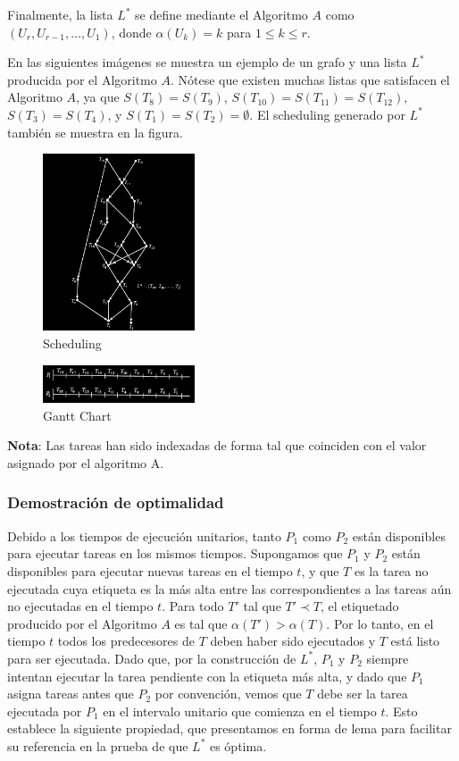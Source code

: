 \documentclass[14pt]{extarticle}
\begin{document}
Finalmente, la lista $L^*$ se define mediante el Algoritmo $A$ como $(U_r, U_{r-1}, \ldots, U_1)$, donde $\alpha(U_k) = k$ para $1 \leq k \leq r$.

En las siguientes imágenes se muestra un ejemplo de un grafo y una lista $L^*$ producida por el Algoritmo $A$. Nótese que existen muchas listas que satisfacen el Algoritmo $A$, ya que $S(T_8) = S(T_9)$, $S(T_{10}) = S(T_{11}) = S(T_{12})$, $S(T_3) = S(T_4)$, y $S(T_1) = S(T_2) = \emptyset$. El scheduling generado por $L^*$ también se muestra en la figura.

\begin{figure}[h]
    \centering
    \includegraphics[width=0.4\textwidth]{images/partial_order.png}
    \caption{Scheduling}
\end{figure}

\begin{figure}[h]
    \centering
    \includegraphics[width=0.4\textwidth]{images/gantt_chart.png}
    \caption{Gantt Chart}
\end{figure}

\textbf{Nota}: Las tareas han sido indexadas de forma tal que coinciden con el valor asignado por el algoritmo A.

\subsubsection*{Demostración de optimalidad}

Debido a los tiempos de ejecución unitarios, tanto $P_1$ como $P_2$ están disponibles para ejecutar tareas en los mismos tiempos. Supongamos que $P_1$ y $P_2$ están disponibles para ejecutar nuevas tareas en el tiempo $t$, y que $T$ es la tarea no ejecutada cuya etiqueta es la más alta entre las correspondientes a las tareas aún no ejecutadas en el tiempo $t$. Para todo $T'$ tal que $T' \prec T$, el etiquetado producido por el Algoritmo $A$ es tal que $\alpha(T') > \alpha(T)$. Por lo tanto, en el tiempo $t$ todos los predecesores de $T$ deben haber sido ejecutados y $T$ está listo para ser ejecutada. Dado que, por la construcción de $L^*$, $P_1$ y $P_2$ siempre intentan ejecutar la tarea pendiente con la etiqueta más alta, y dado que $P_1$ asigna tareas antes que $P_2$ por convención, vemos que $T$ debe ser la tarea ejecutada por $P_1$ en el intervalo unitario que comienza en el tiempo $t$. Esto establece la siguiente propiedad, que presentamos en forma de lema para facilitar su referencia en la prueba de que $L^*$ es óptima.
\end{document}
